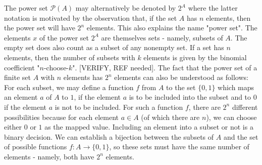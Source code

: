 \medskip
The power set $\mathcal{P}(A)$ may alternatively be denoted by $2^A$ where the latter notation is motivated by the observation that, if the set $A$ has $n$ elements, then the power set will have $2^n$ elements. This also explains the name "power set". The elements $x$ of the power set $2^A$ are themselves sets - namely, subsets of $A$. The empty set does also count as a subset of any nonempty set. If a set has $n$ elements, then the number of subsets with $k$ elements is given by the binomial coefficient "$n$-choose-$k$". [VERIFY, REF needed]. The fact that the power set of a finite set $A$ with $n$ elements has $2^n$ elements can also be understood as follows: For each subset, we may define a function $f$ from $A$ to the set $\{0,1\}$ which maps an element $a$ of $A$ to $1$, if the element $a$ is to be included into the subset and to $0$ if the element $a$ is not to be included. For such a function $f$, there are $2^n$ different possibilities because for each element $a \in A$ (of which there are $n$), we can choose either $0$ or $1$ as the mapped value. Including an element into a subset or not is a binary decision. We can establish a bijection between the subsets of $A$ and the set of possible functions $f: A \rightarrow \{0,1\}$, so these sets must have the same number of elements - namely, both have $2^n$ elements.

